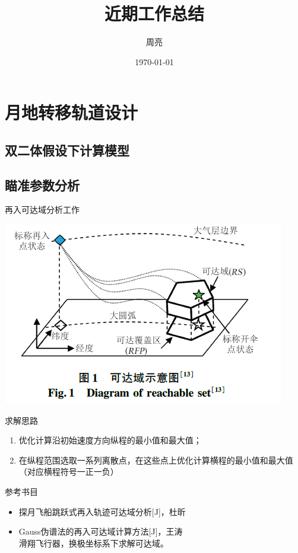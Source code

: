 \documentclass[11pt]{ctexbeamer}
\author{周亮}
\title{近期工作总结}
\institute{102教研室}
\date{\today}
\begin{document}
\begin{frame}
	\titlepage
\end{frame}

\begin{frame}
	\tableofcontents
\end{frame}

\section{月地转移轨道设计}
\subsection{双二体假设下计算模型}

\subsection{瞄准参数分析}
\begin{frame}{再入可达域分析工作}
	\begin{minipage}{0.4\linewidth}
		\includegraphics[height=.4\textheight]{reachable_set.png}
	\end{minipage}
	\hspace{1cm}
	\begin{minipage}{0.4\linewidth}
		\begin{block}{求解思路}
			\begin{enumerate}
				\item 优化计算沿初始速度方向纵程的最小值和最大值；
				\item 在纵程范围选取一系列离散点，在这些点上优化计算横程的最小值和最大值（对应横程符号一正一负）
			\end{enumerate}
		\end{block}
	\end{minipage}
	\begin{block}{参考书目}
		\begin{itemize}
			\item {{\color{red} 探月飞船跳跃式再入轨迹可达域分析}[J]，杜昕}
			\item Gauss伪谱法的再入可达域计算方法[J]，王涛\\
			      滑翔飞行器，换极坐标系下求解可达域。
		\end{itemize}
	\end{block}
\end{frame}
\end{document}
